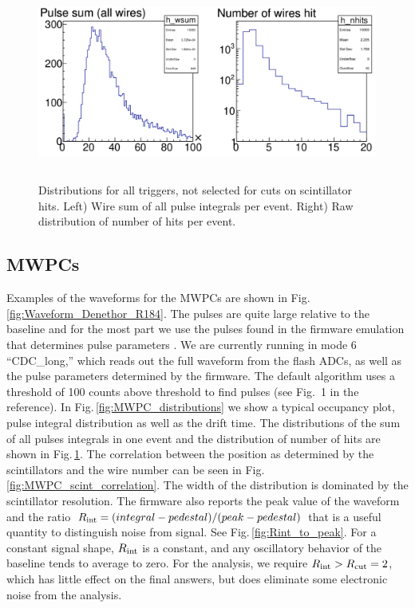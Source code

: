 \documentclass[12pt]{article}
\begin{document}
\begin{figure}[tbph]
\begin{center}
\includegraphics[height=6.5cm,clip=true]{Arwen_R188_sum_nhits}
\caption{Distributions for all triggers, not selected for cuts on scintillator hits.
Left) Wire sum of all pulse integrals per event. Right) Raw distribution of number of hits per event.
\label{fig:Arwen_R188_sum_nhits}}
\end{center}
\end{figure} 

\subsection{MWPCs}
Examples of the waveforms for the MWPCs are shown in Fig.\,\ref{fig:Waveform_Denethor_R184}. The pulses are quite large relative to the baseline and for the most part we use the pulses found in the firmware emulation that determines pulse parameters \cite{hdnote2274}. We are currently running in mode 6 ``CDC\_long,'' which reads out the full waveform from the flash ADCs, as well as the pulse parameters determined by the firmware.  The default algorithm uses a threshold of 100 counts above threshold to find pulses (see Fig.~1 in the reference). In Fig.\,\ref{fig:MWPC_distributions} we show a typical occupancy plot, pulse integral distribution as well as the drift time. The distributions of the sum of all pulses integrals in one event and the distribution of number of hits are shown in Fig.\,\ref{fig:Arwen_R188_sum_nhits}.
The correlation between the position as determined by the scintillators and the wire number can be seen in Fig.\,\ref{fig:MWPC_scint_correlation}. The width of the distribution is dominated by the scintillator resolution. The firmware also reports the peak value of the waveform and the ratio $R_{\rm int}= (integral - pedestal)/(peak-pedestal)$ that is a useful quantity to distinguish noise from signal. See Fig.\,\ref{fig:Rint_to_peak}. For a constant signal shape, $R_{\rm int}$ is a constant, and any oscillatory behavior of the baseline tends to average to zero.  For the analysis, we require $R_{\rm int} > R_{\rm cut} =2$, which has little effect on the final answers, but does eliminate some electronic noise from the analysis. 
\end{document}
